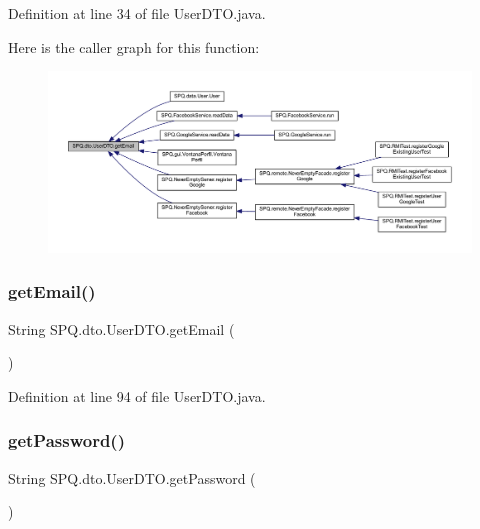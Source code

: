 Definition at line 34 of file User\+D\+T\+O.\+java.

Here is the caller graph for this function\+:
\nopagebreak
\begin{figure}[H]
\begin{center}
\leavevmode
\includegraphics[width=350pt]{class_s_p_q_1_1dto_1_1_user_d_t_o_a67038ab8bab7cb7119ece00bcb20a360_icgraph}
\end{center}
\end{figure}
\mbox{\label{class_s_p_q_1_1dto_1_1_user_d_t_o_a67038ab8bab7cb7119ece00bcb20a360}} 
\subsubsection{\texorpdfstring{get\+Email()}{getEmail()}\hspace{0.1cm}{\footnotesize\ttfamily [3/3]}}
{\footnotesize\ttfamily String S\+P\+Q.\+dto.\+User\+D\+T\+O.\+get\+Email (\begin{DoxyParamCaption}{ }\end{DoxyParamCaption})}



Definition at line 94 of file User\+D\+T\+O.\+java.

\mbox{\label{class_s_p_q_1_1dto_1_1_user_d_t_o_a955f436e60336683283a6fcd6fc5f874}} 
\subsubsection{\texorpdfstring{get\+Password()}{getPassword()}\hspace{0.1cm}{\footnotesize\ttfamily [1/3]}}
{\footnotesize\ttfamily String S\+P\+Q.\+dto.\+User\+D\+T\+O.\+get\+Password (\begin{DoxyParamCaption}{ }\end{DoxyParamCaption})}



